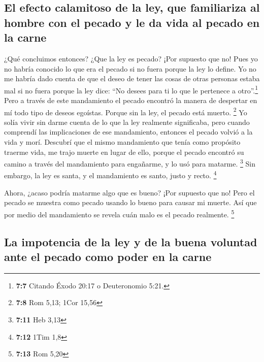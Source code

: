 \hypertarget{el-efecto-calamitoso-de-la-ley-que-familiariza-al-hombre-con-el-pecado-y-le-da-vida-al-pecado-en-la-carne}{%
\subsection{El efecto calamitoso de la ley, que familiariza al hombre
con el pecado y le da vida al pecado en la
carne}\label{el-efecto-calamitoso-de-la-ley-que-familiariza-al-hombre-con-el-pecado-y-le-da-vida-al-pecado-en-la-carne}}

 ¿Qué concluimos entonces? ¿Que la ley es pecado? ¡Por
supuesto que no! Pues yo no habría conocido lo que era el pecado si no
fuera porque la ley lo define. Yo no me habría dado cuenta de que el
deseo de tener las cosas de otras personas estaba mal si no fuera porque
la ley dice: ``No desees para ti lo que le pertenece a
otro''.\footnote{\textbf{7:7} Citando Éxodo 20:17 o Deuteronomio 5:21.}
 Pero a través de este mandamiento el pecado encontró la
manera de despertar en mí todo tipo de deseos egoístas. Porque sin la
ley, el pecado está muerto. \footnote{\textbf{7:8} Rom 5,13; 1Cor 15,56}
 Yo solía vivir sin darme cuenta de lo que la ley
realmente significaba, pero cuando comprendí las implicaciones de ese
mandamiento, entonces el pecado volvió a la vida y morí. 
Descubrí que el mismo mandamiento que tenía como propósito traerme vida,
me trajo muerte en lugar de ello,  porque el pecado
encontró su camino a través del mandamiento para engañarme, y lo usó
para matarme. \footnote{\textbf{7:11} Heb 3,13}  Sin
embargo, la ley es santa, y el mandamiento es santo, justo y recto.
\footnote{\textbf{7:12} 1Tim 1,8}

 Ahora, ¿acaso podría matarme algo que es bueno? ¡Por
supuesto que no! Pero el pecado se muestra como pecado usando lo bueno
para causar mi muerte. Así que por medio del mandamiento se revela cuán
malo es el pecado realmente. \footnote{\textbf{7:13} Rom 5,20}

\hypertarget{la-impotencia-de-la-ley-y-de-la-buena-voluntad-ante-el-pecado-como-poder-en-la-carne}{%
\subsection{La impotencia de la ley y de la buena voluntad ante el
pecado como poder en la
carne}\label{la-impotencia-de-la-ley-y-de-la-buena-voluntad-ante-el-pecado-como-poder-en-la-carne}}

